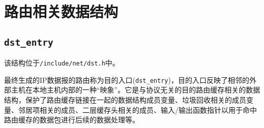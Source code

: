     \section{路由相关数据结构}
				
		\subsection{\texttt{dst_entry}}

			该结构位于\texttt{/include/net/dst.h}中。
			
			最终生成的IP数据报的路由称为目的入口(\texttt{dst_entry})，目的入口反映了相邻的外部主机在本地主机内部的一种“映象”。它是与协议无关的目的路由缓存相关的数据结构，保护了路由缓存链接在一起的数据结构成员变量、垃圾回收相关的成员变量、邻居项相关的成员、二层缓存头相关的成员、输入/输出函数指针以用于命中路由缓存的数据包进行后续的数据处理等。

